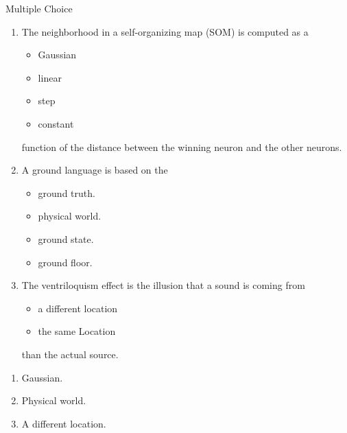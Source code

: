 \documentclass{article}
\begin{document}

\begin{exercise}{Multiple Choice}
  \begin{enumerate}
    \item The neighborhood in a self-organizing map (SOM) is computed as a 
      \begin{itemize}
        \item Gaussian
        \item linear
        \item step
        \item constant
      \end{itemize}
      function of the distance between the winning neuron and the other neurons.

    \item A ground language is based on the 
      \begin{itemize}
        \item ground truth.
        \item physical world.
        \item ground state.
        \item ground floor.
      \end{itemize}

    \item The ventriloquism effect is the illusion that a sound is coming from 
      \begin{itemize}
        \item a different location
        \item the same Location
      \end{itemize}
      than the actual source.
  \end{enumerate}

  \begin{solution}
    \begin{enumerate}
      \item Gaussian.
      \item Physical world.
      \item A different location.
    \end{enumerate}
  \end{solution}
\end{exercise}
\end{document}
